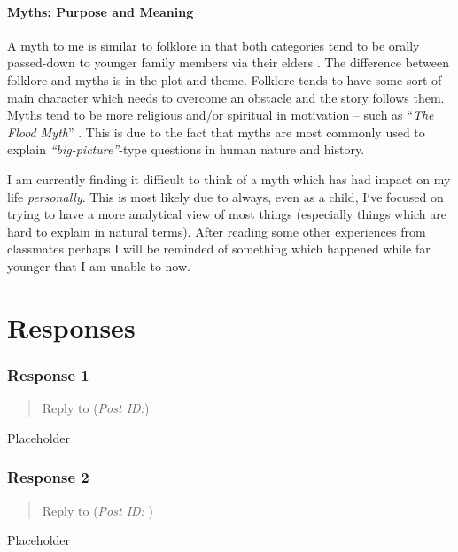 \documentclass[12pt]{article}
\theoremstyle{definition}
\theoremstyle{plain}
\begin{document}
      \subsection{Myths: Purpose and Meaning}
        A myth to me is similar to folklore in that both categories tend to be
          orally passed-down to younger family members via their elders
          \autocite[p.~xiii]{textbook}. The difference between folklore and
          myths is in the plot and theme. Folklore tends to have some sort of
          main character which needs to overcome an obstacle and the story
          follows them. Myths tend to be more religious and/or spiritual in
          motivation -- such as ``\textit{The Flood Myth}''
          \autocite[p.~xiv]{textbook}. This is due to the fact that myths are
          most commonly used to explain \textit{``big-picture''}-type
          questions in human nature and history.

        I am currently finding it difficult to think of a myth which has had
          impact on my life \textit{personally}. This is most likely due to
          always, even as a child, I`ve focused on trying to have a more
          analytical view of most things (especially things which are hard
          to explain in natural terms). After reading some other experiences
          from classmates perhaps I will be reminded of something which happened
          while far younger that I am unable to now.


  \newpage
  \part{Responses}

    \section{Response 1}
      \begin{quote}
        Reply to \textbf{} (\textit{Post ID:})
      \end{quote}
      Placeholder

    \section{Response 2}
      \begin{quote}
        Reply to \textbf{} (\textit{Post ID: }) 
      \end{quote}
      Placeholder

  \newpage
  \nocite{textbook}
  \printbibliography[
    heading=bibintoc,
    title={Works Cited}
  ]
\end{document}
